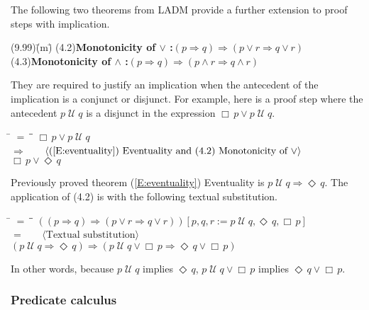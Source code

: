 \documentclass[12pt, fleqn, leqno]{article}
\newcommand{\lgap}{2pt}                             %
\newcommand{\mymathindent}{24pt}                    %
\newcommand{\impl}{\ensuremath{\Rightarrow}}        %
\newcommand{\Until}{\;\mathcal{U}\;}
\newcommand{\Event}{\Diamond\,}
\newcommand{\Always}{\Box\,}
\newcommand{\myqedtab}{\hspace{384pt}}              %
\newcommand{\Gll} {\langle}                         %
\newcommand{\Ggg} {\rangle}                         %
\newcommand{\Hint}[1]     {\ \ \ $\Gll              \mbox{#1} \Ggg$ }   %
\begin{document}
The following two theorems from LADM provide a further extension to proof steps with implication.
\begin{tabbing}
(9.99)\;\=(m)\;\=\kill
(4.2)\>\textbf{Monotonicity of $\lor$ :}\quad $(p\impl q) \impl (p\lor r \impl q\lor r)$\\[\lgap]
(4.3)\>\textbf{Monotonicity of $\land$ :}\quad $(p\impl q) \impl (p\land r \impl q\land r)$
\end{tabbing}
They are required to justify an implication when the antecedent of the implication is a conjunct or disjunct.
For example, here is a proof step where the antecedent $p\Until q$ is a disjunct in the expression $\Always p\lor p \Until q$.
\begin{tabbing}
\hspace{\mymathindent} \= $= \;$ \= \myqedtab \= \kill
\> \> $\Always p\lor p \Until q$\\[\lgap]
\> $\impl$ \> \Hint{(\ref{E:eventuality}) Eventuality and (4.2) Monotonicity of $\lor$} \\[\lgap]
\> \> $\Always p\lor \Event q$
\end{tabbing}
Previously proved theorem (\ref{E:eventuality}) Eventuality is $p \Until q \impl \Event q$.
The application of (4.2) is with the following textual substitution.
\begin{tabbing}
\hspace{\mymathindent} \= $= \;$ \= \myqedtab \= \kill
\> \> $((p\impl q) \impl (p\lor r \impl q\lor r))[p,q,r := p\Until q, \Event q, \Always p]$\\[\lgap]
\> $=$ \> \Hint{Textual substitution} \\[\lgap]
\> \> $(p\Until q\impl \Event q) \impl (p\Until q\lor \Always p \impl \Event q\lor \Always p)$
\end{tabbing}
In other words, because $p\Until q$ implies $\Event q$, $p\Until q\lor \Always p$ implies $\Event q\lor \Always p$.

\subsubsection*{Predicate calculus}
\end{document}
